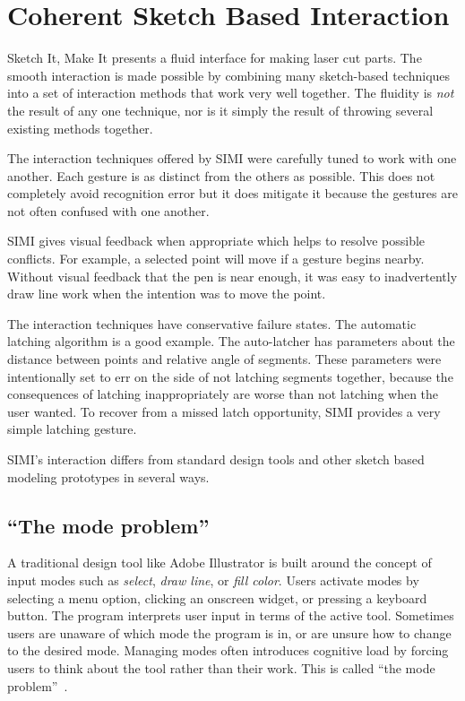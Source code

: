 \section{Coherent Sketch Based Interaction}

Sketch It, Make It presents a fluid interface for making laser cut
parts. The smooth interaction is made possible by combining many
sketch-based techniques into a set of interaction methods that work
very well together. The fluidity is \textit{not} the result of any one
technique, nor is it simply the result of throwing several existing
methods together.

The interaction techniques offered by SIMI were carefully tuned to
work with one another. Each gesture is as distinct from the others as
possible. This does not completely avoid recognition error but it does
mitigate it because the gestures are not often confused with one
another.

SIMI gives visual feedback when appropriate which helps to resolve
possible conflicts. For example, a selected point will move if a
gesture begins nearby. Without visual feedback that the pen is near
enough, it was easy to inadvertently draw line work when the intention
was to move the point.

The interaction techniques have conservative failure states. The
automatic latching algorithm is a good example. The auto-latcher has
parameters about the distance between points and relative angle of
segments. These parameters were intentionally set to err on the side
of not latching segments together, because the consequences of
latching inappropriately are worse than not latching when the user
wanted. To recover from a missed latch opportunity, SIMI provides a
very simple latching gesture.

SIMI's interaction differs from standard design tools and other sketch
based modeling prototypes in several ways.

\subsection{``The mode problem''}

A traditional design tool like Adobe Illustrator is built around the
concept of input modes such as \textit{select}, \textit{draw line}, or
\textit{fill color}. Users activate modes by selecting a menu option,
clicking an onscreen widget, or pressing a keyboard button. The
program interprets user input in terms of the active tool. Sometimes
users are unaware of which mode the program is in, or are unsure how
to change to the desired mode. Managing modes often introduces
cognitive load by forcing users to think about the tool rather than
their work. This is called ``the mode
problem''~\cite{tesler-mode-problem}.

